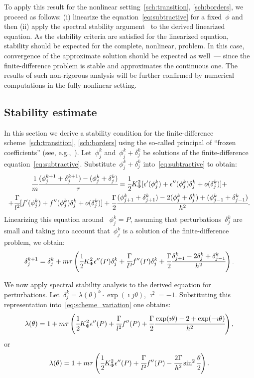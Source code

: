 To apply this result for the nonlinear setting~\eqref{sch:transition}, \eqref{sch:borders},
we proceed as follows:
(i) linearize the equation~\eqref{eq:subtractive}
for a fixed~$\phi$ and then (ii) apply the spectral stability
argument~\cite{bahvalov_computational_methods} to the
derived linearized equation. As the stability criteria are
satisfied for the linearized equation, stability should be expected for the
complete, nonlinear, problem. In this case, convergence of the
approximate solution should be expected as well~--- since
the finite-difference problem is stable and approximates the continuous
one.
The results of such non-rigorous analysis will be further confirmed by
numerical computations in the fully nonlinear setting.


\subsection{Stability estimate}

In this section we derive a stability condition for the
finite-difference scheme~\eqref{sch:transition}, \eqref{sch:borders}
using the so-called principal of ``frozen coefficients''
(see, e.g.,~\cite{bahvalov_computational_methods}).
Let~$\phi_j^k$ and~$\phi_j^k + \delta_j^k$ be solutions of the
finite-difference equation~\eqref{eq:subtractive}.
Substitute~$\phi_j^k + \delta_j^k$ into~\eqref{eq:subtractive} to obtain:
\begin{multline*}
  \cfrac{1}{m} \cfrac{(\phi_j^{k + 1} + \delta_j^{k + 1}) - (\phi_j^k + \delta_j^k)}{\tau} = \cfrac{1}{2} K_\Phi^2 [\epsilon'(\phi_j^k) + \epsilon''(\phi_j^k) \delta_j^k + o(\delta_j^k)] + \\ + \cfrac{\Gamma}{l^2} [f'(\phi_j^k) + f''(\phi_j^k) \delta_j^k + o(\delta_j^k)] + \cfrac{\Gamma}{2} \cfrac{(\phi_{j + 1}^k + \delta_{j + 1}^k) - 2 (\phi_j^k + \delta_j^k) + (\phi_{j - 1}^k + \delta_{j - 1}^k)}{h^2} {\text{.}}
\end{multline*}
Linearizing this equation around~ $\phi_j^k = P$, assuming that
perturbations~$\delta_j^k$ are small and taking into account
that~$\phi_j^k$ is a solution of the finite-difference problem, we obtain:
\begin{equation}
  \delta_j^{k + 1} = \delta_j^k + m \tau \left( \cfrac{1}{2} K_\Phi^2 \epsilon''(P) \delta_j^k + \cfrac{\Gamma}{l^2} f''(P) \delta_j^k + \cfrac{\Gamma}{2} \cfrac{{\delta}_{j + 1}^k - 2 {\delta}_j^k + {\delta}_{j - 1}^k}{h^2} \right) {\text{.}}
  \label{eq:scheme_variation}
\end{equation} 

We now apply spectral stability analysis to the derived equation for
perturbations.
Let~$\delta_j^k = \lambda(\theta)^k \cdot \exp(\imath j \theta)$, $\imath^2 = -1$.
Substituting this representation into~\eqref{eq:scheme_variation} one obtains:
$$\lambda(\theta) = 1 + m \tau \left( \cfrac{1}{2} K_\Phi^2 \epsilon''(P) + \cfrac{\Gamma}{l^2} f''(P) + \cfrac{\Gamma}{2} \cfrac{\exp(\imath \theta) - 2 + \exp(-\imath \theta)}{h^2} \right) {\text{,}}$$
or
\begin{equation}
  \lambda(\theta) = 1 + m \tau \left( \cfrac{1}{2} K_\Phi^2 \epsilon''(P) + \cfrac{\Gamma}{l^2} f''(P) - \cfrac{2 \Gamma}{h^2} \sin^2 \cfrac{\theta}{2} \right) {\text{.}}
  \label{eq:spectral}
\end{equation}

